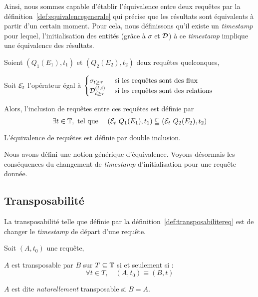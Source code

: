 Ainsi, nous sommes capable d'établir l'équivalence entre deux requêtes par la définition~\ref{def:equivalencegenerale} qui précise que les résultats sont équivalents à partir d'un certain moment. Pour cela, nous définissons qu'il existe un \textit{timestamp} pour lequel, l'initialisation des entités (grâce à $\sigma$ et $\mathcal{D}$) à ce \textit{timestamp} implique une équivalence des résultats.
\begin{defi}\label{def:equivalencegenerale}
    Soient $(Q_1(E_1),t_1)$ et $(Q_2(E_2),t_2)$ deux requêtes quelconques,

    Soit $\mathcal{E}_t$ l'opérateur égal à $\begin{cases} \sigma_{t\geq \tau} & \textrm{ si les requêtes sont des flux}\\ \mathcal{D}_{t\geq \tau}^{(t,i)} & \textrm{  si les requêtes sont des relations}\end{cases}$

    Alors, l'inclusion de requêtes entre ces requêtes est définie par $$\exists t \in \mathbb{T}, \textrm{ tel que } \quad (\mathcal{E}_t\ Q_1(E_1), t_1) \subseteqq (\mathcal{E}_t\  Q_2(E_2), t_2)$$

    L'équivalence de requêtes est définie par double inclusion.
\end{defi}

Nous avons défini une notion générique d'équivalence. Voyons désormais les conséquences du changement de \textit{timestamp} d'initialisation pour une requête donnée.
\subsection{Transposabilité}
La transposabilité telle que définie par la définition~\ref{def:transposabilitereq} est de changer le \textit{timestamp} de départ d'une requête.
\begin{defi}\label{def:transposabilitereq}
    Soit $(A,t_0)$ une requête,

    $A$ est transposable par $B$ sur $T\subseteq \mathbb{T}$ si et seulement si : $$\forall t\in T, \quad (A,t_0) \equiv (B,t)$$

    $A$ est dite \textit{naturellement} transposable si $B=A$.
\end{defi}

